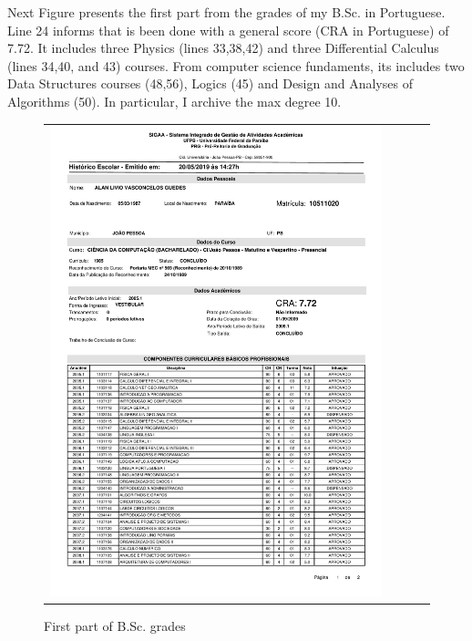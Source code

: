 \documentclass[10pt,a4paper,sans,colorlinks]{moderncv}
\begin{document}
Next Figure presents the first part from the grades of my B.Sc. in Portuguese.
Line 24 informs that is been done with a general score (CRA in Portuguese) of 7.72.
It includes three Physics (lines 33,38,42) and three Differential Calculus (lines 34,40, and 43) courses.
From computer science fundaments, its includes two Data Structures courses (48,56), Logics (45) and  Design and Analyses of Algorithms (50).
In particular, I archive the max degree 10.
\vspace{2em}
\begin{figure}
  \begin{tabularx}{\textwidth}{X p{1cm}}
    \includegraphics[align=t,width=0.92\textwidth, keepaspectratio, trim=0cm 0cm 0cm 2cm]{../static/certificates/bsc-grades.pdf}
  \end{tabularx}
  \caption{First part of B.Sc. grades}
\end{figure}

\newpage
\end{document}

